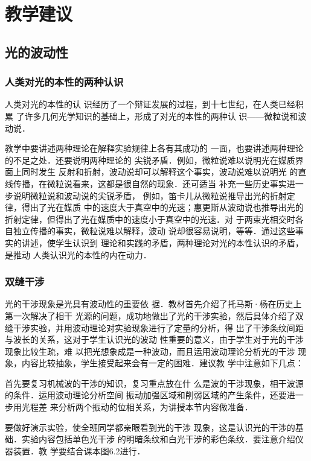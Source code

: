 \section{教学建议}
\subsection{光的波动性}
\subsubsection{人类对光的本性的两种认识}

人类对光的本性的认
识经历了一个辩证发展的过程，到十七世纪，在人类已经积累
了许多几何光学知识的基础上，形成了对光的本性的两种认
识——微粒说和波动说．

教学中要讲述两种理论在解释实验规律上各有其成功的
一面，也要讲述两种理论的不足之处．还要说明两种理论的
尖锐矛盾．例如，微粒说难以说明光在媒质界面上同时发生
反射和折射，波动说却可以解释这个事实，波动说难以说明光
的直线传播，在微粒说看来，这都是很自然的现象．还可适当
补充一些历史事实进一步说明微粒说和波动说的尖锐矛盾，
例如，笛卡儿从微粒说推导出光的折射定律，得出了光在媒质
中的速度大于真空中的光速；惠更斯从波动说也推导出光的
折射定律，但得出了光在媒质中的速度小于真空中的光速．对
于两束光相交时各自独立传播的事实，微粒说难以解释，波动
说却很容易说明，等等．通过这些事实的讲述，使学生认识到
理论和实践的矛盾，两种理论对光的本性认识的矛盾，是推动
人类认识光的本性的内在动力．

\subsubsection{双缝干涉}

光的干涉现象是光具有波动性的重要依
据．教材首先介绍了托马斯·杨在历史上第一次解决了相干
光源的问题，成功地做出了光的干涉实验，然后具体介绍了双
缝干涉实验，并用波动理论对实验现象进行了定量的分析，得
出了干涉条纹间距与波长的关系，这对于学生认识光的波动
性重要的意义，由于学生对于光的干涉现象比较生疏，难
以把光想象成是一种波动，而且运用波动理论分析光的干涉
现象，内容比较抽象，学生接受起来会有一定的困难．建议教
学中注意如下几点：

首先要复习机械波的干涉的知识，复习重点放在什
么是波的干涉现象，相干波源的条件．运用波动理论分析空间
振动加强区域和削弱区域的产生条件，还要进一步用光程差
来分析两个振动的位相关系，为讲授本节内容做准备．

要做好演示实验，使全班同学都亲眼看到光的干涉
现象，这是认识光的干涉的基础．实验内容包括单色光干涉
的明暗条纹和白光干涉的彩色条纹．要注意介绍仪器装置．教
学要结合课本图6.2进行．


